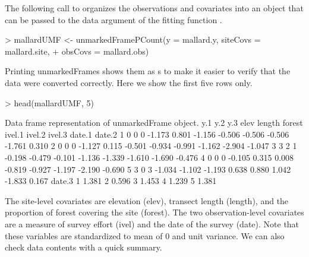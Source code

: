\documentclass[article,shortnames]{jss}
\begin{document}
The following call to  organizes the observations 
and covariates into an object that can be passed to the data argument of
the fitting function .

\begin{Schunk}
\begin{Sinput}
> mallardUMF <- unmarkedFramePCount(y = mallard.y, siteCovs = mallard.site, 
+     obsCovs = mallard.obs)
\end{Sinput}
\end{Schunk}

Printing unmarkedFrames shows them as s to make it easier to verify 
that the data were converted correctly. Here we show the first five rows only. 

\begin{Schunk}
\begin{Sinput}
> head(mallardUMF, 5)
\end{Sinput}
\begin{Soutput}
Data frame representation of unmarkedFrame object.
  y.1 y.2 y.3   elev length forest ivel.1 ivel.2 ivel.3 date.1 date.2
1   0   0   0 -1.173  0.801 -1.156 -0.506 -0.506 -0.506 -1.761  0.310
2   0   0   0 -1.127  0.115 -0.501 -0.934 -0.991 -1.162 -2.904 -1.047
3   3   2   1 -0.198 -0.479 -0.101 -1.136 -1.339 -1.610 -1.690 -0.476
4   0   0   0 -0.105  0.315  0.008 -0.819 -0.927 -1.197 -2.190 -0.690
5   3   0   3 -1.034 -1.102 -1.193  0.638  0.880  1.042 -1.833  0.167
  date.3
1  1.381
2  0.596
3  1.453
4  1.239
5  1.381
\end{Soutput}
\end{Schunk}

The site-level covariates are elevation (elev), transect length (length), 
and the proportion of forest covering the site (forest).  The two 
observation-level covariates are a measure of survey effort (ivel) and the date 
of the survey (date).  Note that these variables are standardized to 
mean of 0 and unit variance.  We can also check data contents with a quick summary.
\end{document}
